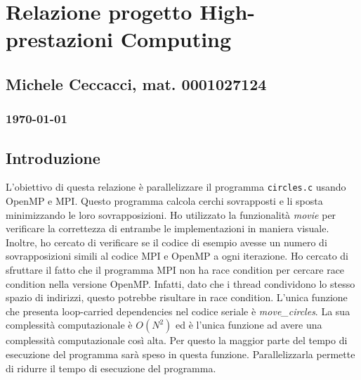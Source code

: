 \documentclass[a4paper,11pt, twoside]{report}
\begin{document}
\section*{Relazione progetto High-prestazioni Computing}
\subsection*{Michele Ceccacci, mat. 0001027124}
\subsubsection*{\today}

\subsection*{Introduzione}
L'obiettivo di questa relazione è parallelizzare il programma \texttt{circles.c} usando OpenMP e MPI.
Questo programma calcola cerchi sovrapposti e li sposta minimizzando le loro sovrapposizioni.
Ho utilizzato la funzionalità \textit{movie} per verificare la correttezza di entrambe le implementazioni in maniera visuale. 
Inoltre, ho cercato di verificare se il codice di esempio avesse un numero di sovrapposizioni simili al codice MPI e OpenMP a ogni iterazione.
Ho cercato di sfruttare il fatto che il programma MPI non ha race condition per cercare race condition nella versione OpenMP.
Infatti, dato che i thread condividono lo stesso spazio di indirizzi, questo potrebbe risultare in race condition.
L'unica funzione che presenta loop-carried dependencies nel codice seriale è \textit{move\_circles}.
La sua complessità computazionale è $O(N^2)$ ed è l'unica funzione ad avere una complessità computazionale così alta.
Per questo la maggior parte del tempo di esecuzione del programma sarà speso in questa funzione.
Parallelizzarla permette di ridurre il tempo di esecuzione del programma.
\end{document}
